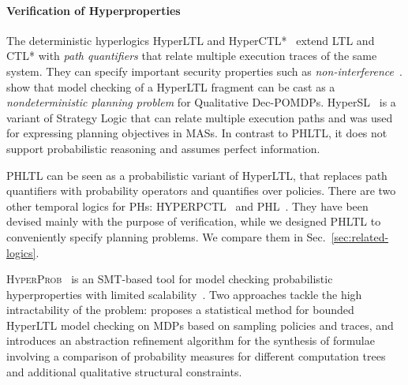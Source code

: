 \paragraph{Verification of Hyperproperties}
The deterministic hyperlogics HyperLTL and HyperCTL*~\cite{ClarksonFKMRS14}
extend \acs{LTL} and CTL* with \emph{path quantifiers} that relate multiple execution traces of the same system.
They can specify important security properties such as \emph{non-interference}~\cite{McLean94}.
\citet{BeutnerF24icaps} show that model checking of a HyperLTL fragment can be cast as a \emph{nondeterministic planning problem} for Qualitative \acp{Dec-POMDP}.
HyperSL~\cite{BeutnerF24aamas} is a variant of Strategy Logic that can relate multiple execution paths
and was used for expressing planning objectives in \acp{MAS}.
In contrast to \acs{PHLTL}, it does not support probabilistic reasoning and assumes perfect information.

\acs{PHLTL} can be seen as a probabilistic variant of HyperLTL,
that replaces path quantifiers with probability operators and quantifies over policies.
There are two other temporal logics for \acp{PH}:
\acs{HYPERPCTL}~\cite{AbrahamBBD20} and \acs{PHL}~\cite{DimitrovaFT20}.
They have been devised mainly with the purpose of verification,
while we designed \acs{PHLTL} to conveniently specify planning problems.
We compare them in Sec.~\ref{sec:related-logics}.

\textsc{HyperProb}~\cite{DobeABB21} is an SMT-based tool for model checking probabilistic hyperproperties with limited scalability~\cite{AndriushchenkoBCPS23}.
Two approaches tackle the high intractability of the problem:
\cite{DobeSBBLPW23} proposes a statistical method for bounded HyperLTL model checking on \acp{MDP} based on sampling policies and traces,
and \cite{AndriushchenkoBCPS23} introduces an abstraction refinement algorithm for the synthesis of formulae involving a comparison of probability measures for different computation trees and additional qualitative structural constraints.